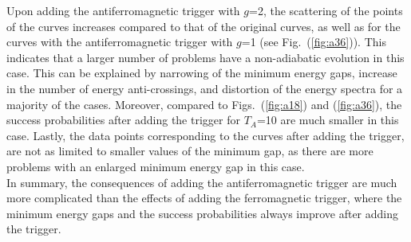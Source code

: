 \documentclass[../main.tex]{subfiles}
\begin{document}
Upon adding the antiferromagnetic trigger with $g$=2, the scattering of the points of the curves increases compared to that of the original curves, as well as for the curves with the antiferromagnetic trigger with $g$=1 (see Fig.~(\ref{fig:a36})). This indicates that a larger number of problems have a non-adiabatic evolution in this case. This can be explained by narrowing of the minimum energy gaps, increase in the number of energy anti-crossings, and distortion of the energy spectra for a majority of the cases. Moreover, compared to Figs.~(\ref{fig:a18}) and (\ref{fig:a36}), the success probabilities after adding the trigger for $T_A$=10 are much smaller in this case. Lastly, the data points corresponding to the curves after adding the trigger, are not as limited to smaller values of the minimum gap, as there are more problems with an enlarged minimum energy gap in this case.\\

In summary, the consequences of adding the antiferromagnetic trigger are much more complicated than the effects of adding the ferromagnetic trigger, where the minimum energy gaps and the success probabilities always improve after adding the trigger.
\end{document}
